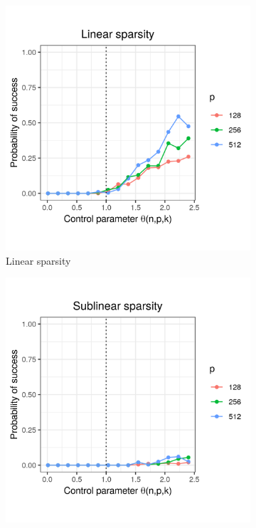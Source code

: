 \documentclass[letterpaper,12pt]{article}
\begin{document}
\begin{figure}[h]
  \centering
  \begin{subfigure}{0.32\textwidth}
    \includegraphics[width=0.9\linewidth]{uniform_linear_sparsity_alpha_050}
    \caption{Linear sparsity}
    \label{fig:uniform_linear_sparsity_alpha_1}
  \end{subfigure}
  \begin{subfigure}{0.32\textwidth}
    \includegraphics[width=0.9\linewidth]{uniform_sublinear_sparsity_alpha_050}

\end{subfigure}
\end{figure}
\end{document}
